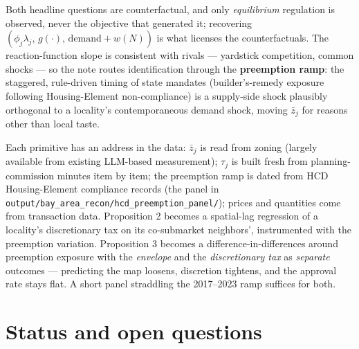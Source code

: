 \documentclass[11pt]{article}
\begin{document}
Both headline questions are counterfactual, and only \emph{equilibrium} regulation is observed, never
the objective that generated it; recovering $(\phi_j\lambda_j,\, g(\cdot),\, \text{demand} + w(N))$ is
what licenses the counterfactuals. The reaction-function slope is consistent with rivals --- yardstick
competition, common shocks --- so the note routes identification through the \textbf{preemption ramp}:
the staggered, rule-driven timing of state mandates (builder's-remedy exposure following
Housing-Element non-compliance) is a supply-side shock plausibly orthogonal to a locality's
contemporaneous demand shock, moving $\bar z_j$ for reasons other than local taste.

Each primitive has an address in the data: $\bar z_j$ is read from zoning (largely available from
existing LLM-based measurement); $\tau_j$ is built fresh from planning-commission minutes item by
item; the preemption ramp is dated from HCD Housing-Element compliance records (the panel in
\texttt{output/bay\_area\_recon/hcd\_preemption\_panel/}); prices and quantities come from transaction data.
Proposition 2 becomes a spatial-lag regression of a locality's discretionary tax on its co-submarket
neighbors', instrumented with the preemption variation. Proposition 3 becomes a
difference-in-differences around preemption exposure with the \emph{envelope} and the
\emph{discretionary tax} as \emph{separate} outcomes --- predicting the map loosens, discretion
tightens, and the approval rate stays flat. A short panel straddling the 2017--2023 ramp suffices for
both.

\section{Status and open questions}
\end{document}
